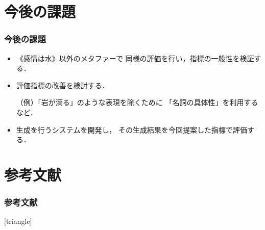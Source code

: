 \documentclass[12pt,usepdftitle=false]{beamer}
\begin{document}
\section{今後の課題}
\begin{frame}
    \frametitle{今後の課題}
    \addtolength{\leftmargini}{-1\zw}
    \begin{itemize}
		\item 《感情は水》以外のメタファーで
            同様の評価を行い，指標の一般性を検証する．

        \item 評価指標の改善を検討する．

            （例）「岩が滴る」のような表現を除くために
            「名詞の具体性」を利用するなど．

        \item 生成を行うシステムを開発し，
            その生成結果を今回提案した指標で評価する．
    \end{itemize}
\end{frame}

\section{参考文献}
\begin{frame}
\frametitle{参考文献}
\begingroup
\footnotesize
    [triangle]
    
    
\endgroup
\addtocounter{framenumber}{-1}
\end{frame}
\end{document}
